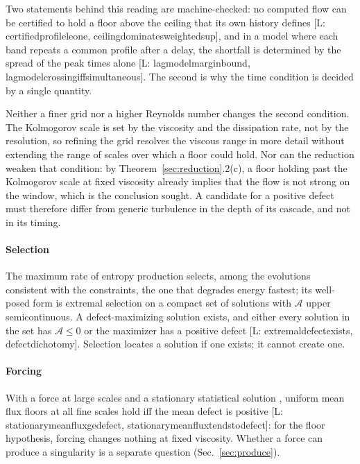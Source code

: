 \documentclass[letterpaper,twocolumn]{article}
\newcommand{\lean}[1]{{\footnotesize\def\_{\textunderscore\allowbreak}%
\hspace{0pt}[L: {\ttfamily\fontdimen3\font=2pt\fontdimen4\font=1pt #1}]}}
\newcommand{\A}{\mathcal{A}}
\begin{document}
Two statements behind this reading are machine-checked: no computed flow
can be certified to hold a floor above the ceiling that its own history
defines \lean{certified\_profile\_le\_one,
ceiling\_dominates\_weighted\_sup}, and in a model where each band
repeats a common profile after a delay, the shortfall is determined by
the spread of the peak times alone \lean{lag\_model\_margin\_bound,
lag\_model\_crossing\_iff\_simultaneous}. The second is why the time
condition is decided by a single quantity.

Neither a finer grid nor a higher Reynolds number changes the second
condition. The Kolmogorov scale is set by the viscosity and the
dissipation rate, not by the resolution, so refining the grid resolves
the viscous range in more detail without extending the range of scales
over which a floor could hold. Nor can the reduction weaken that
condition: by Theorem~\ref{sec:reduction}.2(c), a floor holding past the
Kolmogorov scale at fixed viscosity already implies that the flow is not
strong on the window, which is the conclusion sought. A candidate for a
positive defect must therefore differ from generic turbulence in the
depth of its cascade, and not in its timing.

\paragraph*{Selection}

The maximum rate of entropy production \cite{GliLazChe20a,CheGliSai24b}
selects, among the evolutions consistent with the constraints, the one
that degrades energy fastest; its well-posed form is extremal selection
on a compact set of solutions with $\A$ upper semicontinuous. A
defect-maximizing solution exists, and either every solution in the set
has $\A \leq 0$ or the maximizer has a positive defect
\lean{extremal\_defect\_exists, defect\_dichotomy}. Selection locates a
solution if one exists; it cannot create one.

\paragraph*{Forcing}

With a force at large scales and a stationary statistical solution
\cite{FoiManRos04}, uniform mean flux floors at all fine scales hold iff
the mean defect is positive \lean{stationary\_mean\_flux\_ge\_defect,
stationary\_mean\_flux\_tendsto\_defect}: for the floor hypothesis,
forcing changes nothing at fixed viscosity. Whether a force can produce a
singularity is a separate question (Sec.~\ref{sec:produce}).
\end{document}
